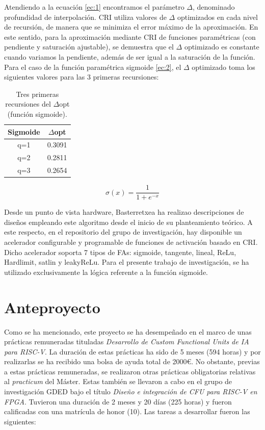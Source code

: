 Atendiendo a la ecuación \eqref{ec:1} encontramos el parámetro $\Delta$, denominado profundidad de interpolación.
CRI utiliza valores de $\Delta$ optimizados en cada nivel de recursión, de manera que se minimiza el error máximo de la aproximación.
En este sentido, para la aproximación mediante CRI de funciones paramétricas (con pendiente y saturación ajustable), se demuestra que el $\Delta$ optimizado es constante cuando variamos la pendiente, además de ser igual a la saturación de la función.
Para el caso de la función paramétrica sigmoide \eqref{ec:2}, el $\Delta$ optimizado toma los siguientes valores para las 3 primeras recursiones:

\begin{table}[h!]
\centering
\caption{Tres primeras recursiones del $\Delta$opt (función sigmoide).}
\label{tab:1}
\begin{tabular}{|c|c|}
\hline
Sigmoide & $\Delta$opt    \\ \hline
q=1      & 0.3091 \\ \hline
q=2      & 0.2811 \\ \hline
q=3      & 0.2654 \\ \hline
\end{tabular}
\end{table}

\begin{equation}\label{ec:2}
\sigma(x)= \frac{1}{1 + e^{-x}}\tag{**}
\end{equation}

Desde un punto de vista hardware, Basterretxea ha realizao descripciones de diseños empleando este algoritmo desde el inicio de su planteamiento teórico.
A este respecto, en el repositorio del grupo de investigación, hay disponible un acelerador configurable y programable de funciones de activación basado en CRI.
Dicho acelerador soporta 7 tipos de FAs: sigmoide, tangente, lineal, ReLu, Hardlimit, satlin y leakyReLu. 
Para el presente trabajo de investigación, se ha utilizado exclusivamente la lógica referente a la función sigmoide.

\section{Anteproyecto}

Como se ha mencionado, este proyecto se ha desempeñado en el marco de unas prácticas remuneradas tituladas \textit{Desarrollo de Custom Functional Units de IA para RISC-V}.
La duración de estas prácticas ha sido de 5 meses (594 horas) y por realizarlas se ha recibido una bolsa de ayuda total de 2000€.
No obstante, previas a estas prácticas remuneradas, se realizaron otras prácticas obligatorias relativas al \textit{practicum} del Máster.
Estas también se llevaron a cabo en el grupo de investigación GDED bajo el título \textit{Diseño e integración de CFU para RISC-V en FPGA}.
Tuvieron una duración de 2 meses y 20 días (225 horas) y fueron calificadas con una matrícula de honor (10).
Las tareas a desarrollar fueron las siguientes:

